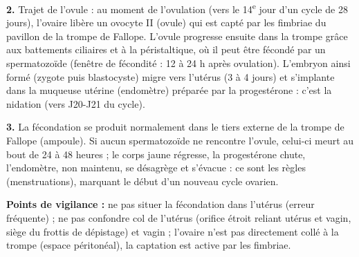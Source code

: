 \documentclass[11pt]{article}
\newcommand{\cle}[1]{{\popxbold\color{popdark}#1}}
\begin{document}
\begin{corrige}
\textbf{2.} Trajet de l'ovule : au moment de l'ovulation (vers le 14\textsuperscript{e} jour d'un cycle de 28 jours), l'ovaire libère un ovocyte II (ovule) qui est capté par les fimbriae du pavillon de la trompe de Fallope. L'ovule progresse ensuite dans la trompe grâce aux battements ciliaires et à la péristaltique, où il peut être fécondé par un spermatozoïde (fenêtre de fécondité : 12 à 24 h après ovulation). L'embryon ainsi formé (zygote puis blastocyste) migre vers l'utérus (3 à 4 jours) et s'implante dans la muqueuse utérine (endomètre) préparée par la progestérone : c'est la nidation (vers J20-J21 du cycle).

\textbf{3.} La fécondation se produit normalement dans le \cle{tiers externe de la trompe de Fallope (ampoule)}. Si aucun spermatozoïde ne rencontre l'ovule, celui-ci meurt au bout de 24 à 48 heures ; le corps jaune régresse, la progestérone chute, l'endomètre, non maintenu, se désagrège et s'évacue : ce sont les règles (menstruations), marquant le début d'un nouveau cycle ovarien.

\textbf{Points de vigilance :} ne pas situer la fécondation dans l'utérus (erreur fréquente) ; ne pas confondre col de l'utérus (orifice étroit reliant utérus et vagin, siège du frottis de dépistage) et vagin ; l'ovaire n'est pas directement collé à la trompe (espace péritonéal), la captation est active par les fimbriae.
\end{corrige}
\end{document}
